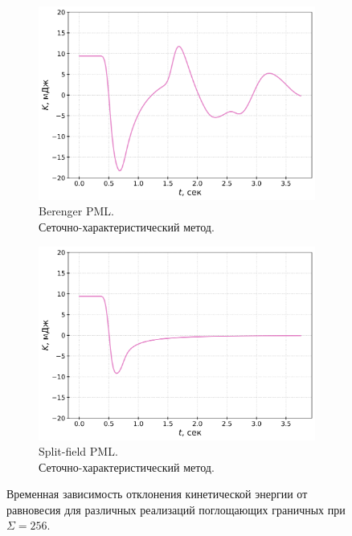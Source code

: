 \begin{figure}[htb]
    \begin{subfigure}{0.475\textwidth}
        \centering
        \includegraphics[width=1.0\textwidth]{images/pml/osc_gcm_Berenger.png}
        \caption{Berenger PML.\\Сеточно-характеристический метод.}
        \label{fig:osc_gcm_berenger}
    \end{subfigure}
\hfill
    \begin{subfigure}{0.475\textwidth}
        \centering
        \includegraphics[width=1.0\textwidth]{images/pml/osc_gcm_split-field.png}
        \caption{Split-field PML.\\Сеточно-характеристический метод.}
        \label{fig:osc_gcm_split}
    \end{subfigure}
\caption{Временная зависимость отклонения кинетической энергии от равновесия для различных реализаций поглощающих граничных при $\Sigma=256$.}
\label{fig:osc_pml}
\end{figure}


